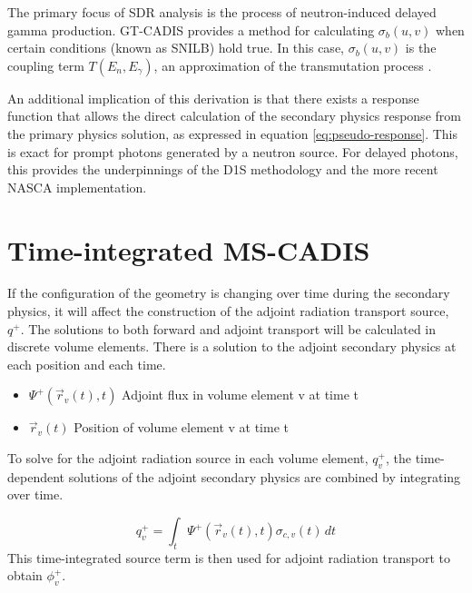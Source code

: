 The primary focus of SDR analysis
is the process of neutron-induced delayed gamma production. 
GT-CADIS provides a method for calculating $\sigma_b(u,v)$ when
certain conditions (known as SNILB) hold true. In this case, $\sigma_b(u,v)$ is the
coupling term $T(E_n,E_\gamma)$, an approximation of the transmutation
process \cite{gtcadis}.  

An additional implication of this derivation is that there exists a response
function that allows the direct calculation of the secondary physics response
from the primary physics solution, as expressed in
equation \ref{eq:pseudo-response}.  This is exact for prompt photons generated
by a neutron source.  For delayed photons, this provides the underpinnings of
the D1S methodology and the more recent NASCA implementation\cite{kit-nasca}.


\section{Time-integrated MS-CADIS}
If the configuration of the geometry is changing over time during
the secondary physics, it will affect the construction of the adjoint radiation
transport source, $q^{+}$.  
The solutions to both forward and adjoint transport will be calculated in discrete
volume elements. There is a solution to the adjoint secondary
physics at each position and each time.%
\begin{itemize}
	\item	{$ \Psi^{+}(\overrightarrow{r}_{v}(t), t)$ Adjoint flux in volume
		element v at time t}
	\item  {$\overrightarrow{r}_{v}(t)$ Position of volume element v at
		time t}
\end{itemize}
To solve for the adjoint radiation source in each volume element,
$q_{v}^{+}$, the time-dependent solutions of the 
adjoint secondary physics are combined by integrating over time.

 \begin{equation}\label{eq:adj_src_1_avg}
	 q_{v}^{+} =
	 \int_{t}  \Psi^{+}(\overrightarrow{r}_{v}(t), t)
	 \sigma_{c,v}(t)\, dt
 \end{equation}
This time-integrated source term is then used
for adjoint radiation transport to obtain $\phi_{v}^{+}$.

